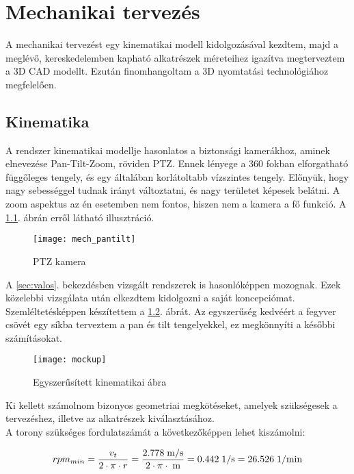 \chapter{Mechanikai tervezés}
A mechanikai tervezést egy kinematikai modell kidolgozásával kezdtem, majd a meglévő, kereskedelemben kapható alkatrészek méreteihez igazítva megterveztem a 3D CAD modellt. Ezután finomhangoltam a 3D nyomtatási technológiához megfelelően.
\section{Kinematika}
A rendszer kinematikai modellje hasonlatos a biztonsági kamerákhoz, aminek elnevezése Pan-Tilt-Zoom, röviden PTZ. Ennek lényege a 360 fokban elforgatható függőleges tengely, és egy általában korlátoltabb vízszintes tengely. Előnyük, hogy nagy sebességgel tudnak irányt változtatni, és nagy területet képesek belátni. A zoom aspektus az én esetemben nem fontos, hiszen nem a kamera a fő funkció. A \ref{fig:mech_pantilt}. ábrán erről látható illusztráció.

\begin{figure}[h!]
	\centering
	\texttt{[image: mech\_pantilt]}
	\caption{PTZ kamera}
	\label{fig:mech_pantilt}
\end{figure}

A \ref{sec:valos}. bekezdésben vizsgált rendszerek is hasonlóképpen mozognak. Ezek közelebbi vizsgálata után elkezdtem kidolgozni a saját koncepciómat. Szemléltetésképpen készítettem a \ref{fig:megval_mockup}. ábrát. Az egyszerűség kedvéért a fegyver csövét egy síkba terveztem a pan és tilt tengelyekkel, ez megkönnyíti a későbbi számításokat.

\begin{figure}[h!]
	\centering
	\texttt{[image: mockup]}
	\caption{Egyszerűsített kinematikai ábra}
	\label{fig:megval_mockup}
\end{figure}

Ki kellett számolnom bizonyos geometriai megkötéseket, amelyek szükségesek a tervezéshez, illetve az alkatrészek kiválasztásához. \\

A torony szükséges fordulatszámát a következőképpen lehet kiszámolni:


\begin{equation}
	rpm_{min} = \frac{v_t}{2 \cdot \pi \cdot r} = \frac{2.778 \; \mathrm{m/s}}{2 \cdot \pi \cdot \; \mathrm{m}} = 0.442 \; \mathrm{1/s} = 26.526 \; \mathrm{1/min}
\end{equation}

